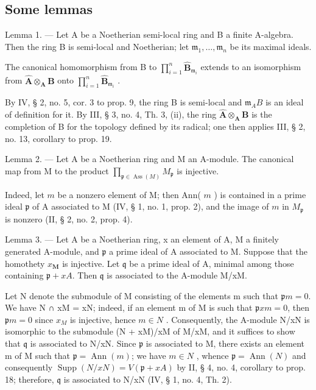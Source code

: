 \subsection{Some lemmas}

Lemma 1. --- Let A be a Noetherian semi-local ring and B a finite A-algebra. Then the ring B is semi-local and Noetherian; let \(\mathfrak{m}_1, \ldots, \mathfrak{m}_n\) be its maximal ideals.

The canonical homomorphism from B to \(\prod_{i=1}^{n} \hat{\mathbf{B}}_{\mathfrak{m}_i}\) extends to an isomorphism from \(\hat{\mathbf{A}} \otimes_{\mathbf{A}} \mathbf{B}\) onto \(\prod_{i=1}^{n} \hat{\mathbf{B}}_{\mathfrak{m}_i}\) .

By IV, § 2, no. 5, cor. 3 to prop. 9, the ring B is semi-local and \(\mathfrak{m}_{A}B\) is an ideal of definition for it. By III, § 3, no. 4, Th. 3, (ii), the ring \(\hat{\mathbf{A}} \otimes_{\mathbf{A}} \mathbf{B}\) is the completion of B for the topology defined by its radical; one then applies III, § 2, no. 13, corollary to prop. 19.

Lemma 2. — Let A be a Noetherian ring and M an A-module. The canonical map from M to the product \(\prod_{\mathfrak{p} \in \operatorname{Ass}(M)} M_{\mathfrak{p}}\) is injective.

Indeed, let \(m\) be a nonzero element of M; then Ann( \(m\) ) is contained in a prime ideal \(\mathfrak{p}\) of A associated to M (IV, § 1, no. 1, prop. 2), and the image of \(m\) in \(M_{\mathfrak{p}}\) is nonzero (II, § 2, no. 2, prop. 4).

Lemma 3. — Let A be a Noetherian ring, x an element of A, M a finitely generated A-module, and \(\mathfrak{p}\) a prime ideal of A associated to M. Suppose that the homothety \(x_{\mathbf{M}}\) is injective. Let \(\mathfrak{q}\) be a prime ideal of A, minimal among those containing \(\mathfrak{p} + xA\). Then \(\mathfrak{q}\) is associated to the A-module M/xM.

Let N denote the submodule of M consisting of the elements m such that \(\mathfrak{p}m = 0\). We have N ∩ xM = xN; indeed, if an element m of M is such that \(\mathfrak{p}xm = 0\), then \(\mathfrak{p}m = 0\) since \(x_{M}\) is injective, hence \(m \in N\) . Consequently, the A-module N/xN is isomorphic to the submodule (N + xM)/xM of M/xM, and it suffices to show that \(\mathfrak{q}\) is associated to N/xN. Since \(\mathfrak{p}\) is associated to M, there exists an element m of M such that \(\mathfrak{p} = \operatorname{Ann}(m)\); we have \(m \in N\) , whence \(\mathfrak{p} = \operatorname{Ann}(N)\) and consequently \(\operatorname{Supp}(N/xN) = V(\mathfrak{p} + xA)\) by II, § 4, no. 4, corollary to prop. 18; therefore, \(\mathfrak{q}\) is associated to N/xN (IV, § 1, no. 4, Th. 2).

